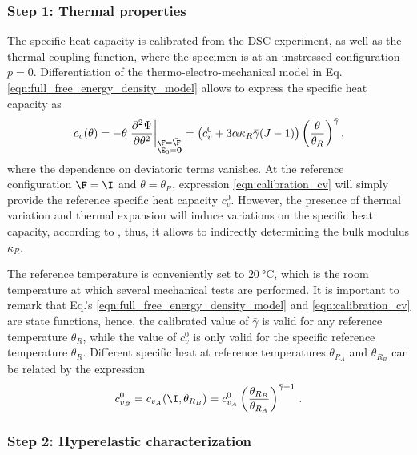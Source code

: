 \subsubsection{Step 1: Thermal properties}

The specific heat capacity is calibrated from the DSC experiment, as well as the thermal coupling function, where the specimen is at an unstressed configuration $p=0$. Differentiation of the thermo-electro-mechanical model in Eq. \eqref{eqn:full_free_energy_density_model} allows to express the specific heat capacity as
\begin{equation} \label{eqn:calibration_cv}
  c_v(\theta) =
    -\theta \left. \frac{\partial^2\Psi}{\partial \theta^2} \right|_{\substack{\F=\bar\F\hfill\\ \E_0=\mathbf{0}}} =
    \left(c_v^0 + 3\alpha\kappa_R\bar\gamma(J-1)\right)
    \left(\frac{\theta}{\theta_R}\right)^{\bar\gamma} ,
\end{equation}
where the dependence on deviatoric terms vanishes.
At the reference configuration $\F=\I$ and $\theta=\theta_R$, expression \eqref{eqn:calibration_cv} will simply provide the reference specific heat capacity $c_v^0$. However, the presence of thermal variation and thermal expansion will induce variations on the specific heat capacity, according to \cite{BonetGil2026}, thus, it allows to indirectly determining the bulk modulus $\kappa_R$.

The reference temperature is conveniently set to $\SI{20}{\celsius}$, which is the room temperature at which several mechanical tests are performed.
It is important to remark that Eq.'s \eqref{eqn:full_free_energy_density_model} and \eqref{eqn:calibration_cv} are state functions, hence, the calibrated value of $\bar\gamma$ is valid for any reference temperature $\theta_R$, while the value of $c_v^0$ is only valid for the specific reference temperature $\theta_R$. Different specific heat at reference temperatures $\theta_{R_A}$ and $\theta_{R_B}$ can be related by the expression
\begin{equation}
  c_{v_B}^0 = c_{v_A} (\I,\theta_{R_B}) = c_{v_A}^0 \left(\frac{\theta_{R_B}}{\theta_{R_A}}\right)^{\bar\gamma+1} \,.
\end{equation}



\subsubsection{Step 2: Hyperelastic characterization}


